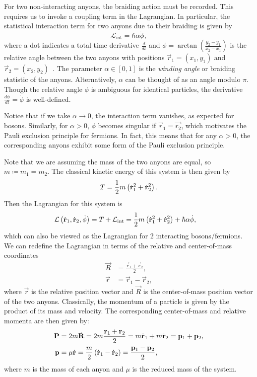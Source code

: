 For two non-interacting anyons, the braiding action must be recorded. This requires us to invoke a coupling term in the Lagrangian. In particular, the statistical interaction term for two anyons due to their braiding is given by
\begin{equation}
    \mathcal{L}_{\text{int}} = \hbar\alpha\dot{\phi},
\end{equation}
where a dot indicates a total time derivative $\frac{d}{dt}$ and $\phi = \arctan\left( \frac{y_2-y_1}{x_2-x_1} \right)$ is the relative angle between the two anyons with positions $\vec{r}_1=(x_1,y_1)$ and $\vec{r}_2=(x_2,y_2)$~\cite{Khare2005,Wilczek1982}. The parameter $\alpha\in\left[ 0,1 \right]$ is the \textit{winding angle} or braiding statistic of the anyons. Alternatively, $\alpha$ can be thought of as an angle modulo $\pi$. Though the relative angle $\phi$ is ambiguous for identical particles, the derivative $\frac{d\phi}{dt}=\dot{\phi}$ is well-defined.

Notice that if we take $\alpha\to 0$, the interaction term vanishes, as expected for bosons. Similarly, for $\alpha>0$, $\phi$ becomes singular if $\vec{r}_1 = \vec{r_2}$, which motivates the Pauli exclusion principle for fermions. In fact, this means that for any $\alpha>0$, the corresponding anyons exhibit some form of the Pauli exclusion principle.

Note that we are assuming the mass of the two anyons are equal, so $m\coloneq m_1=m_2$. The classical kinetic energy of this system is then given by
\begin{equation}
    T = \frac{1}{2}m\left( {\dot{\mathbf{r}}_1}^2 + {\dot{\mathbf{r}}_2}^2 \right).
\end{equation}
Then the Lagrangian for this system is
\begin{align}
    \mathcal{L}\left( \dot{\mathbf{r}}_1,\dot{\mathbf{r}}_2, \dot{\phi} \right) &= T + \mathcal{L}_{\text{int}} = \frac{1}{2}m\left( {\dot{\mathbf{r}}_1}^2 + {\dot{\mathbf{r}}_2}^2 \right) + \hbar\alpha\dot{\phi},
\end{align}
which can also be viewed as the Lagrangian for 2 interacting bosons/fermions. We can redefine the Lagrangian in terms of the relative and center-of-mass coordinates
\begin{align}
    \vec{R} &= \frac{\vec{r}_1+\vec{r}_2}{2}, \\
    \vec{r} &= \vec{r}_1-\vec{r}_2,
\end{align}
where $\vec{r}$ is the relative position vector and $\vec{R}$ is the center-of-mass position vector of the two anyons. Classically, the momentum of a particle is given by the product of its mass and velocity. The corresponding center-of-mass and relative momenta are then given by:
\begin{align}
    \mathbf{P} &= 2m\dot{\mathbf{R}} = 2m \frac{\mathbf{r}_1+\mathbf{r}_2}{2} = m\dot{\mathbf{r}}_1 + m\dot{\mathbf{r}}_2 = \mathbf{p}_1 + \mathbf{p}_2, \\
    \mathbf{p} &= \mu\dot{\mathbf{r}} = \frac{m}{2}\left( \dot{\mathbf{r}}_1-\dot{\mathbf{r}}_2 \right) = \frac{\mathbf{p}_1 - \mathbf{p}_2}{2},
\end{align}
where $m$ is the mass of each anyon and $\mu$ is the reduced mass of the system.


